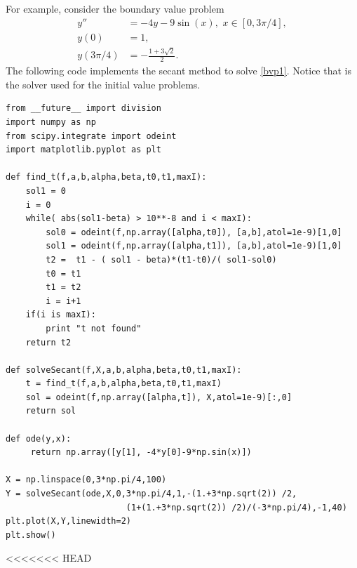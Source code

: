 For example, consider the boundary value problem
\begin{equation}
\begin{split}
\label{bvp1}
y'' &= -4y -9\sin(x), \,\, x \in [0,3\pi/4],\\
y(0) &= 1, \\
y(3 \pi/4) &= -\frac{1+3\sqrt{2}}{2}.
\end{split}
\end{equation}
The following code implements the secant method to solve \eqref{bvp1}. Notice that  is the solver used for the initial value problems.

\begin{lstlisting}
from __future__ import division
import numpy as np
from scipy.integrate import odeint
import matplotlib.pyplot as plt

def find_t(f,a,b,alpha,beta,t0,t1,maxI):
	sol1 = 0
	i = 0
	while( abs(sol1-beta) > 10**-8 and i < maxI):
		sol0 = odeint(f,np.array([alpha,t0]), [a,b],atol=1e-9)[1,0]
		sol1 = odeint(f,np.array([alpha,t1]), [a,b],atol=1e-9)[1,0]
		t2 =  t1 - ( sol1 - beta)*(t1-t0)/( sol1-sol0)
		t0 = t1
		t1 = t2
		i = i+1
	if(i is maxI):
		print "t not found"
	return t2

def solveSecant(f,X,a,b,alpha,beta,t0,t1,maxI):
    t = find_t(f,a,b,alpha,beta,t0,t1,maxI)
    sol = odeint(f,np.array([alpha,t]), X,atol=1e-9)[:,0]
    return sol

def ode(y,x): 
     return np.array([y[1], -4*y[0]-9*np.sin(x)])

X = np.linspace(0,3*np.pi/4,100)
Y = solveSecant(ode,X,0,3*np.pi/4,1,-(1.+3*np.sqrt(2)) /2,
						(1+(1.+3*np.sqrt(2)) /2)/(-3*np.pi/4),-1,40)
plt.plot(X,Y,linewidth=2)
plt.show()
\end{lstlisting}

<<<<<<< HEAD

% 
% 


